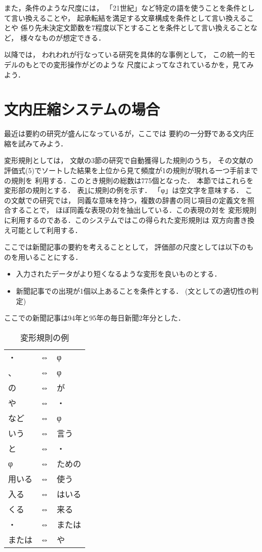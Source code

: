 また，条件のような尺度には，
「21世紀」など特定の語を使うことを条件として言い換えることや，
起承転結を満足する文章構成を条件として言い換えることや
係り先未決定文節数を7程度以下とすること\cite{murata_7pm2_nlp}を条件として言い換えることなど，
様々なものが想定できる．

以降では，
われわれが行なっている研究を具体的な事例として，
この統一的モデルのもとでの変形操作がどのような
尺度によってなされているかを，見てみよう．


\section{文内圧縮システムの場合}

最近は要約の研究\cite{Kato1999}が盛んになっているが，ここでは
要約の一分野である文内圧縮を試みてみよう．

変形規則としては，
文献\cite{murata_nl2001_henkei}の3節の研究で自動獲得した規則のうち，
その文献の評価式(5)でソートした結果を上位から見て頻度が1の規則が現れる一つ手前までの規則を
利用する．このとき規則の総数は775個となった．
本節ではこれらを変形部の規則とする．
表\ref{tab:hitode_kisoku_djr}に規則の例を示す．
「φ」は空文字を意味する．
この文献\cite{murata_nl2001_henkei,murata_henkeirule_nlp2004}での研究では，
同義な意味を持つ，複数の辞書の同じ項目の定義文を照合することで，
ほぼ同義な表現の対を抽出している．この表現の対を
変形規則に利用するのである．このシステムではこの得られた変形規則は
双方向書き換え可能として利用する．

ここでは新聞記事の要約を考えることとして，
評価部の尺度としては以下のものを用いることにする．
\begin{itemize}
\item 
  入力されたデータがより短くなるような変形を良いものとする．

\item 
  新聞記事での出現が1個以上あることを条件とする．
  (文としての適切性の判定)

\end{itemize}
ここでの新聞記事は94年と95年の毎日新聞2年分とした．

\begin{table}[t]
  \begin{center}
    \leavevmode
    \caption{変形規則の例}
    \label{tab:hitode_kisoku_djr}
\begin{tabular}[h]{|lll|}\hline
・&⇔&φ\\
、&⇔&φ\\
の&⇔&が\\
や&⇔&・\\
など&⇔&φ\\
いう&⇔&言う\\
と&⇔&・\\
φ&⇔&ための\\
用いる&⇔&使う\\
入る&⇔&はいる\\
くる&⇔&来る\\
・&⇔&または\\
または&⇔&や\\\hline
\end{tabular}
  \end{center}
\end{table}

